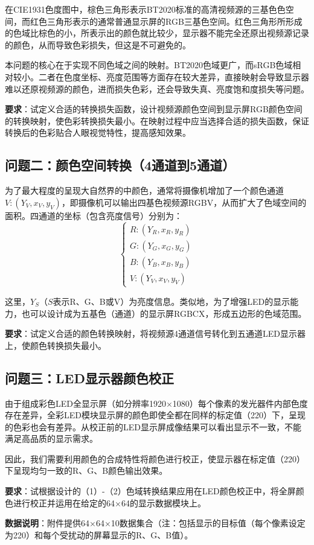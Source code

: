在CIE1931色度图中，棕色三角形表示BT2020标准的高清视频源的三基色色空间，而红色三角形表示的通常普通显示屏的RGB三基色空间。红色三角形所形成的色域比棕色的小，所表示出的颜色就比较少，显示器不能完全还原出视频源记录的颜色，从而导致色彩损失，但这是不可避免的。

本问题的核心在于实现不同色域之间的映射。BT2020色域更广，而sRGB色域相对较小。二者在色度坐标、亮度范围等方面存在较大差异，直接映射会导致显示器难以还原视频源的颜色，进而损失色彩，还会导致失真、亮度饱和度损失等问题。

\textbf{要求}：试定义合适的转换损失函数，设计视频源颜色空间到显示屏RGB颜色空间的转换映射，使色彩转换损失最小。在映射过程中应当选择合适的损失函数，保证转换后的色彩贴合人眼视觉特性，提高感知效果。

\subsection[\hspace{-2pt}问题二：颜色空间转换（4通道到5通道）]{{\heiti{} \hspace{-8pt}问题二：颜色空间转换（4通道到5通道）}}\label{subsection1: 问题二}

为了最大程度的呈现大自然界的中颜色，通常将摄像机增加了一个颜色通道$V:(Y_V,x_V,y_V)$，即摄像机可以输出四基色视频源RGBV，从而扩大了色域空间的面积。四通道的坐标（包含亮度信号）分别为：
\begin{equation}
\begin{cases}
R:(Y_R,x_R,y_R) \\
G:(Y_G,x_G,y_G) \\
B:(Y_B,x_B,y_B) \\
V:(Y_V,x_V,y_V)
\end{cases}
\end{equation}

这里，$Y_S$（$S$表示R、G、B或V）为亮度信息。类似地，为了增强LED的显示能力，也可以设计成为五基色（通道）的显示屏RGBCX，形成五边形的色域范围。

\textbf{要求}：试定义合适的颜色转换映射，将视频源4通道信号转化到五通道LED显示器上，使颜色转换损失最小。

\subsection[\hspace{-2pt}问题三：LED显示器颜色校正]{{\heiti{} \hspace{-8pt}问题三：LED显示器颜色校正}}\label{subsection1: 问题三}

由于组成彩色LED全显示屏（如分辨率1920×1080）每个像素的发光器件内部色度存在差异，全彩LED模块显示屏的颜色即使全都在同样的标定值（220）下，呈现的色彩也会有差异。从校正前的LED显示屏成像结果可以看出显示不一致，不能满足高品质的显示需求。

因此，我们需要利用颜色的合成特性将颜色进行校正，使显示器在标定值（220）下呈现均匀一致的R、G、B颜色输出效果。

\textbf{要求}：试根据设计的（1）-（2）色域转换结果应用在LED颜色校正中，将全屏颜色进行校正并运用在给定的64×64的显示数据模块上。

\textbf{数据说明}：附件提供64×64×10数据集合（注：包括显示的目标值（每个像素设定为220）和每个受扰动的屏幕显示的R、G、B值）。
